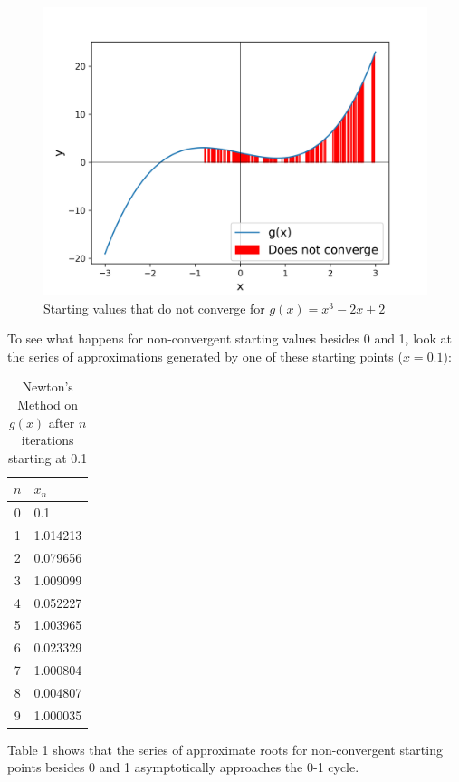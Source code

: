 \documentclass[10pt,a4paper]{article}
\begin{document}
		\begin{figure}[H]
			\centering
			\caption{Starting values that do not converge for $ g(x)  = x^3 - 2x + 2 $}
			\includegraphics[scale=0.5]{figure1}
		\end{figure}
	
		To see what happens for non-convergent starting values besides 0 and 1, look at the series of approximations generated by one of these starting points ($x=0.1$):
		\begin{table}[H]
			\centering
			\caption{Newton's Method on $g(x)$ after $n$ iterations starting at 0.1}
			\begin{tabular}{ c | l }
				\hline
			 	$n$ & $x_n$ \\
			 	\hline\hline
			 	0 & 0.1\\
			 	1 & 1.014213\\
			 	2 & 0.079656\\
			 	3 & 1.009099\\
			 	4 & 0.052227\\
			 	5 & 1.003965\\
			 	6 & 0.023329\\
			 	7 & 1.000804\\
			 	8 & 0.004807\\
			 	9 & 1.000035\\
			\end{tabular}
		\end{table}
		 Table 1 shows that the series of approximate roots for non-convergent starting points besides 0 and 1 asymptotically approaches the 0-1 cycle.
\end{document}
